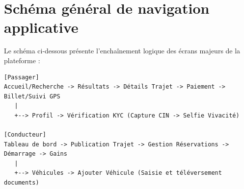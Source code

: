 \section{Schéma général de navigation applicative}
\label{sec:navigation-schema}

Le schéma ci-dessous présente l'enchaînement logique des écrans majeurs de la plateforme :

\begin{verbatim}
[Passager]
Accueil/Recherche -> Résultats -> Détails Trajet -> Paiement -> Billet/Suivi GPS
   |
   +--> Profil -> Vérification KYC (Capture CIN -> Selfie Vivacité)

[Conducteur]
Tableau de bord -> Publication Trajet -> Gestion Réservations -> Démarrage -> Gains
   |
   +--> Véhicules -> Ajouter Véhicule (Saisie et téléversement documents)
\end{verbatim}
